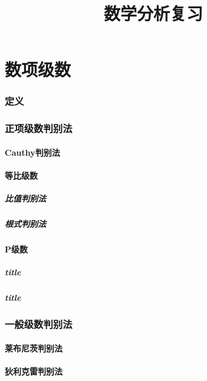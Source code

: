 \documentclass[UTF8]{ctexart}
\title{数学分析复习}
\begin{document}
    \pagestyle{plain}
    \maketitle
    \tableofcontents
\part{数项级数}
\section{定义}
\section{正项级数判别法}
    \subsection{Cauthy判别法}
    \subsection{等比级数}
        \subsubsection{比值判别法}
        \subsubsection{根式判别法}
    \subsection{P级数}
        \subsubsection{title}
        \subsubsection{title}
\section{一般级数判别法}
    \subsection{莱布尼茨判别法}
    \subsection{狄利克雷判别法}
\end{document}
